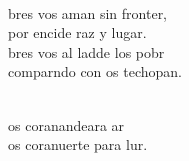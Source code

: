 \documentclass[12pt]{article}
\begin{document}
\begin{multicols*}{2}
\begin{cancion}
\begin{chorus}
	\end{chorus}%
	\jump\\
	bres vos aman sin fronter,\\
	por encide raz y lugar. \\
	bres vos al ladde los pobr\\
	comparndo con os techopan.\\\jump\\
	\begin{chorus}%
	os coranandeara ar\\
	os coranuerte para lur.\\
	\end{chorus}%
	\jump\\
\end{cancion}%


\end{multicols*}
\end{document}
